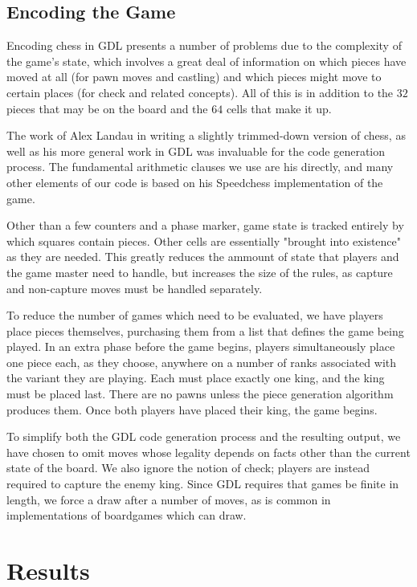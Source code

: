 \documentclass[11pt,letterpaper]{article}
\begin{document}
\subsection{Encoding the Game}
Encoding chess in GDL presents a number of problems due to the complexity of the
game's state, which involves a great deal of information on which pieces have
moved at all (for pawn moves and castling) and which pieces might move to
certain places (for check and related concepts). All of this is in addition to
the \(32\) pieces that may be on the board and the \(64\) cells that make it up.

The work of Alex Landau in writing a slightly trimmed-down version of chess, as
well as his more general work in GDL was invaluable for the code generation
process. The fundamental arithmetic clauses we use are his directly, and many
other elements of our code is based on his Speedchess \cite{spdchess}
implementation of the game.

Other than a few counters and a phase marker, game state is tracked entirely by
which squares contain pieces. Other cells are essentially "brought into
existence" as they are needed. This greatly reduces the ammount of state that
players and the game master need to handle, but increases the size of the rules,
as capture and non-capture moves must be handled separately.

To reduce the number of games which need to be evaluated, we have players place
pieces themselves, purchasing them from a list that defines the game being
played. In an extra phase before the game begins, players simultaneously place
one piece each, as they choose, anywhere on a number of ranks associated with
the variant they are playing. Each must place exactly one king, and the king
must be placed last. There are no pawns unless the piece generation algorithm
produces them. Once both players have placed their king, the game begins.

To simplify both the GDL code generation process and the resulting output, we
have chosen to omit moves whose legality depends on facts other than the current
state of the board. We also ignore the notion of check; players are instead
required to capture the enemy king. Since GDL requires that games be finite in
length, we force a draw after a number of moves, as is common in implementations
of boardgames which can draw.

\section{Results}
\end{document}
